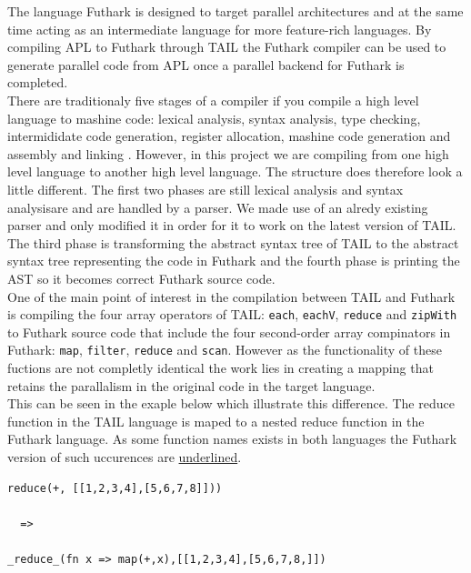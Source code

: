 \documentclass[11pt]{article}
\begin{document}
The language Futhark is designed to target parallel architectures and at the same time acting 
as an intermediate language for more feature-rich languages. By compiling APL to Futhark through TAIL the 
Futhark compiler can be used to generate parallel code from APL once a parallel backend for 
Futhark is completed.\\

There are traditionaly five stages of a compiler if you compile a high level language to mashine code: 
lexical analysis, syntax analysis, type checking, intermididate code generation, register allocation, mashine 
code generation and assembly and linking \cite{TorbenMogensen}. However, in this project we are compiling from 
one high level language to another high level language. The structure does therefore look a little different. 
The first two phases are still lexical analysis and syntax analysisare and are handled by a parser.
We made use of an alredy existing parser \cite{APLACC} and only modified it in order for it to work on the latest 
version of TAIL. The third phase is transforming the abstract syntax tree of TAIL to the abstract syntax tree 
representing the code in Futhark and the fourth phase is printing the AST so it becomes correct 
Futhark source code. \\

One of the main point of interest in the compilation between TAIL and Futhark is compiling the four array operators 
of TAIL: {\tt each}, {\tt eachV}, 
 {\tt reduce} and {\tt zipWith} to Futhark source code that include the four second-order array compinators in Futhark:  
 {\tt map}, {\tt filter}, {\tt reduce} and {\tt scan}. However as the functionality of these fuctions are not completly 
 identical the work lies in creating a mapping that retains the parallalism in the original code in the target language.\\
 This can be seen in the exaple below which illustrate this difference. The reduce function in the
  TAIL language is maped to a nested reduce function in the Futhark language.
  As some function names exists in both languages the Futhark version of such uccurences are \underline{underlined}.

\begin{lstlisting}[numbers=none,frame=none]
reduce(+, [[1,2,3,4],[5,6,7,8]]))

  =>

_reduce_(fn x => map(+,x),[[1,2,3,4],[5,6,7,8,]])

\end{lstlisting}
\end{document}
